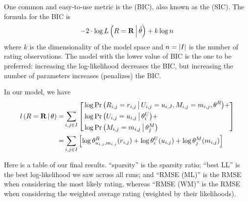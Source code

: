 \documentclass{article}
\begin{document}
One common and easy-to-use metric is the  (BIC), also known as the  (SIC). The formula for the BIC is
\begin{align}
-2 \cdot \log {\ensuremath{ L \left( R = {\bf R} \,\middle|\, \hat{\theta} \right) }} + k \log n
\end{align}
where $k$ is the dimensionality of the model space and $n = {\lvert I \rvert}$
is the number of rating observations. The model with the lower value
of BIC is the one to be preferred: increasing the log-likelihood
decreases the BIC, but increasing the number of parameters
increases (penalizes) the BIC.

In our model, we have 
\begin{align}
{\ensuremath{ l \left( R = {\bf R} \,\middle|\, \theta \right) }}
  =& \sum_{i,j \in I} \left[
    \begin{aligned}
      & \log {{\Pr \left(  R_{i,j} = r_{i,j} \,\middle|\, U_{i,j} = u_{i,J}, M_{i,j} = m_{i,j},
        \theta^R  \right)}} + \\
      & \log {{\Pr \left(  U_{i,j} = u_{i,j} \,\middle|\, \theta^U_i  \right)}} + \\
      & \log {{\Pr \left(  M_{i,j} = m_{i,j} \,\middle|\, \theta^M_j  \right)}}
    \end{aligned}
  \right] \\
  =& \sum_{i,j \in I} \left[
    \log \theta^R_{u_{i,j},m_{i,j}}(r_{i,j}) +
    \log \theta^U_i(u_{i,j}) +
    \log \theta^M_j(m_{i,j})
  \right] \\
\end{align}

Here is a table of our final results. ``sparsity'' is the sparsity
ratio; ``best LL'' is the best log-likelihood we saw across all runs;
and ``RMSE (ML)'' is the RMSE when considering the most likely rating,
whereas ``RMSE (WM)'' is the RMSE when considering the weighted
average rating (weighted by their likelihoods).
\end{document}
